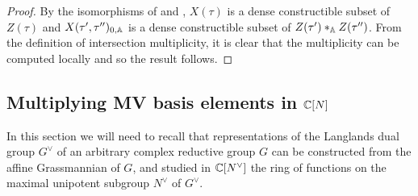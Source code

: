 \documentclass[draft]{article} %
\begin{document}
\begin{proof}
By the isomorphisms of  and , $X(\tau) $ is a dense constructible subset of $ Z(\tau) $ and $ X(\tau', \tau'')_{0,\AA} $ is a dense constructible subset of $ Z(\tau') \ast_\AA Z(\tau'') $. From the definition of intersection multiplicity, it is clear that the multiplicity can be computed locally and so the result follows.
%  
\end{proof}
% 
% 
% 
% 
\subsection{Multiplying MV basis elements in $\CC[N]$}
\label{ss:CN}
% 
In this section we will need to recall that representations of the Langlands dual group $G^\vee$ of an arbitrary complex reductive group $G$ can be constructed from the affine Grassmannian of $G$, and studied in $\CC[N^\vee]$ the ring of functions on the maximal unipotent subgroup $N^\vee$ of $G^\vee$. 
% 
\end{document}
